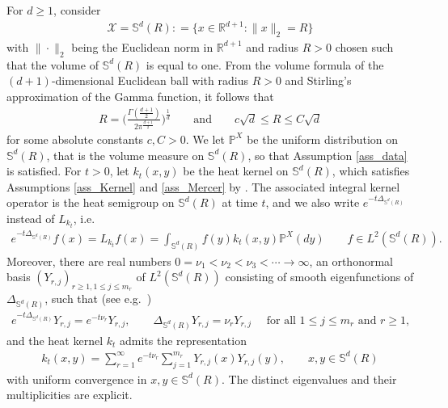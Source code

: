\documentclass[a4paper,11pt]{article} %
\numberwithin{equation}{section}
\theoremstyle{definition}
\theoremstyle{remark}
\theoremstyle{plain}
\begin{document}
For \( d \ge 1 \), consider
\begin{align}
  \mathcal{X} = \mathbb{S}^{d}(R): = \{ x \in \mathbb{R}^{d + 1}: \| x \|_2 = R \} 
\end{align}
with $\|\cdot\|_2$ being the Euclidean norm in $\mathbb{R}^{d+1}$ and radius \( R > 0 \) chosen such that the volume of $ \mathbb{S}^d(R) $ is equal to one. From the volume formula of the \( (d + 1) \)-dimensional Euclidean ball with radius \( R > 0 \) and Stirling's approximation of the Gamma function, it follows that
\begin{align}
  R = \Big(\frac{\Gamma(\frac{d+1}{2})}{2 \pi^{\frac{d+1}{2}}}\Big)^{\frac{1}{d}}
  \qquad \text{and} \qquad
  c\sqrt{d}\leq  R\leq C\sqrt{d}
\end{align}
for some absolute constants $ c, C > 0 $.
We let $ \mathbb{P}^X $ be the uniform distribution on $ \mathbb{S}^d(R) $, that is the volume measure on $ \mathbb{S}^d(R) $, so that Assumption \ref{ass_data} is satisfied. For $t>0$, let $ k_t(x, y) $ be the heat kernel on $ \mathbb{S}^d(R) $, which satisfies Assumptions \ref{ass_Kernel} and \ref{ass_Mercer} by \cite[Theorem 7.13 and Theorem 7.20]{MR2569498}. The associated integral kernel operator  is the heat semigroup on \( \mathbb{S}^{d}(R) \) at time $t$, and we also write $e^{- t \Delta_{\mathbb{S}^{d}(R)}}$ instead of $L_{k_t}$, i.e. 
\begin{align}
  e^{- t \Delta_{\mathbb{S}^{d}(R)}} f(x)=L_{k_t}f(x) = \int_{\mathbb{S}^d(R)} f(y)  k_{t}(x, y) \mathbb{P}^{X}(d y) 
  \qquad f \in L^{2}(\mathbb{S}^{d}(R)).
\end{align}
Moreover, there are real numbers $0=\nu_1<\nu_2<\nu_3<\cdots \rightarrow\infty$, an orthonormal basis \( (Y_{r,j})_{r \ge 1,1\leq j\leq m_r} \) of $ L^{2}(\mathbb{S}^{d}(R))$ consisting of smooth eigenfunctions of \( \Delta_{\mathbb{S}^{d}(R)}\), such that (see e.g.~\cite[Chapter 10.4]{MR2569498})
\begin{align}
  e^{- t \Delta_{\mathbb{S}^{d}(R)}}Y_{r,j}=e^{-t\nu_r}Y_{r,j},\qquad \Delta_{\mathbb{S}^{d}(R)}Y_{r,j}=\nu_rY_{r,j}\quad \text{ for all $1\leq j\leq m_r$ and $r\geq 1$,}
\end{align}
and the heat kernel \( k_{t} \) admits the representation 
\begin{align}
  k_{t}(x, y) = \sum_{r = 1}^{\infty} e^{-t\nu_r} \sum_{j=1}^{m_r}Y_{r,j}(x) Y_{r,j}(y), 
  \qquad x, y \in \mathbb{S}^{d}(R)
\end{align}
with  uniform convergence in $x,y\in \mathbb{S}^{d}(R)$. The distinct eigenvalues and their multiplicities are explicit.
\end{document}
